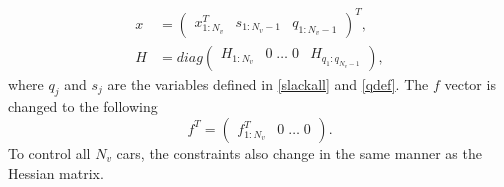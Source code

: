 \documentclass[letterpaper,10pt,conference]{ieeeconf}
\begin{document}
\begin{align}
x &=\begin{pmatrix}
x_{1:N_v}^T & s_{1:N_v-1} & q_{1:N_v-1}
\end{pmatrix}^T,\label{xvec}\\
H &= diag\begin{pmatrix}H_{1:N_v}&0 \; \dots \; 0 & H_{q_1:q_{N_v-1}}\end{pmatrix},
\end{align}
where $q_j$ and $s_j$ are the variables defined in \eqref{slackall} and \eqref{qdef}. The $f$ vector is changed to the following
\begin{equation}
f^T =
\begin{pmatrix}
f^T_{1:N_v} & 0 \; \dots \; 0
\end{pmatrix}.
\end{equation}
To control all $N_v$ cars, the constraints also change in the same manner as the Hessian matrix.
\end{document}
